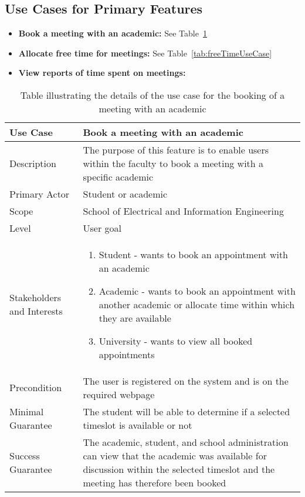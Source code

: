 \documentclass[11pt, a4paper]{article}
\begin{document}
	\subsection{Use Cases for Primary Features}
	\begin{itemize}
		\item \textbf{Book a meeting with an academic: } See Table~\ref{tab:bookUseCase}
		\item \textbf{Allocate free time for meetings: } See Table~\ref{tab:freeTimeUseCase}
		\item \textbf{View reports of time spent on meetings: }
	\end{itemize}
	\begin{table}[]
		\centering%
		\caption{Table illustrating the details of the use case for the booking of a meeting with an academic}
		\label{tab:bookUseCase}
		\begin{tabular}{|p{3cm}| p{10.5cm} |}
			\hline
			\textbf{Use Case} & \textbf{Book a meeting with an academic}\\
			\hline
			\hline
			Description & The purpose of this feature is to enable users within the faculty to book a meeting with a specific academic\\
			\hline
			Primary Actor & Student or academic\\
			\hline
			Scope & School of Electrical and Information Engineering \\
			\hline
			Level & User goal \\
			\hline
			Stakeholders and Interests & \begin{enumerate}
				\item Student - wants to book an appointment with an academic
				\item Academic - wants to book an appointment with another academic or allocate time within which they are available
				\item University - wants to view all booked appointments
				\end{enumerate}\\
				\hline
				Precondition& The user is registered on the system and is on the required webpage\\
				\hline
				Minimal Guarantee& The student will be able to determine if a selected timeslot is available or not\\
				\hline
				Success Guarantee & The academic, student, and school administration can view that the academic was available for discussion within the selected timeslot and the meeting has therefore been booked\\

\end{tabular}
\end{table}
\end{document}
